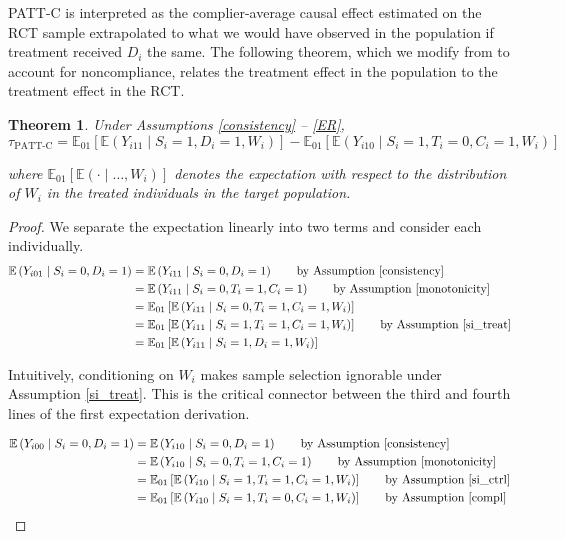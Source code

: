 \documentclass[hidelinks,12pt]{article}
\newtheorem{theorem}{Theorem}
\newcommand{\ex}{\mathbb{E}} %
\begin{document}
{{\color{red}PATT-C is interpreted as the complier-average causal effect estimated on the RCT sample extrapolated to what we would have observed in the population if treatment received $D_i$ the same.} The following theorem, which we modify from \citet{Hartman} to account for noncompliance, relates the treatment effect in the population to the treatment effect in the RCT.

\vskip 0.2in
\begin{theorem}\label{thm1}
Under Assumptions \ref{consistency} -- \ref{ER},
\begin{equation}\label{tpatt-est}
\tau_{\text{PATT-C}} = \ex_{01}\left[  \ex\left(Y_{i11} \mid S_i=1, D_i=1, W_i\right)\right]
-\ex_{01}\left[  \ex\left(Y_{i10} \mid S_i=1, T_i=0, C_i=1, W_i\right) \right] 
\end{equation}

where $\ex_{01}\left[\ex(\cdot \mid\dots, W_i)\right]$ denotes the expectation with respect to the distribution of $W_i$ in the treated individuals in the target population. 
\end{theorem}

\begin{proof}
We separate the expectation linearly into two terms and consider each individually.
\begin{align*}
\ex\left(Y_{i01} \mid S_i=0,D_i=1\right) &= \ex\left(Y_{i11} \mid S_i=0, D_i=1\right) \tag*{by Assumption \ref{consistency}} \\
&= \ex\left(Y_{i11} \mid S_i=0, T_i=1, C_i=1\right) \tag*{by Assumption \ref{monotonicity}} \\
&= \ex_{01}\left[  \ex\left(Y_{i11} \mid S_i=0, T_i=1, C_i=1, W_i\right) \right] \\
&= \ex_{01}\left[  \ex\left(Y_{i11} \mid S_i=1, T_i=1, C_i=1, W_i\right) \right] \tag*{by Assumption \ref{si_treat}} \\
&= \ex_{01}\left[  \ex\left(Y_{i11} \mid S_i=1, D_i=1, W_i\right)\right] 
\end{align*}

{\color{red}Intuitively, conditioning on $W_i$ makes sample selection ignorable under Assumption \ref{si_treat}. This is the critical connector between the third and fourth lines of the first expectation derivation.}
	
\begin{align*}
\ex\left(Y_{i00} \mid S_i=0, D_i=1\right) &= \ex\left(Y_{i10} \mid S_i=0, D_i=1\right) \tag*{by Assumption \ref{consistency}} \\
&= \ex\left(Y_{i10} \mid S_i=0, T_i=1, C_i=1\right) \tag*{by Assumption \ref{monotonicity}} \\
&= \ex_{01}\left[  \ex\left(Y_{i10} \mid S_i=1, T_i=1, C_i=1, W_i\right) \right] \tag*{by Assumption \ref{si_ctrl}} \\
&= \ex_{01}\left[  \ex\left(Y_{i10} \mid S_i=1, T_i=0, C_i=1, W_i\right) \right] \tag*{by Assumption \ref{compl}}\\
\end{align*}


\end{proof}}
\end{document}
